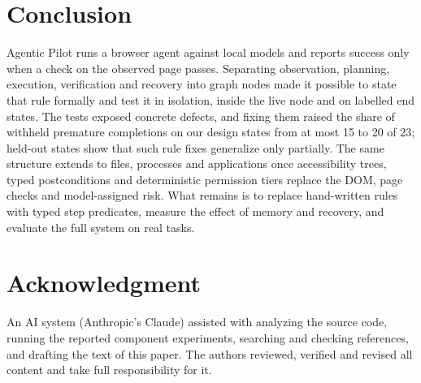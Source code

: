 \section{Conclusion}
\label{sec:conclusion}

Agentic Pilot runs a browser agent against local models and reports success only when a check on the observed page passes. Separating observation, planning, execution, verification and recovery into graph nodes made it possible to state that rule formally and test it in isolation, inside the live node and on labelled end states. The tests exposed concrete defects, and fixing them raised the share of withheld premature completions on our design states from at most 15 to 20 of 23; held-out states show that such rule fixes generalize only partially. The same structure extends to files, processes and applications once accessibility trees, typed postconditions and deterministic permission tiers replace the DOM, page checks and model-assigned risk. What remains is to replace hand-written rules with typed step predicates, measure the effect of memory and recovery, and evaluate the full system on real tasks.

\section*{Acknowledgment}
 An AI system (Anthropic's Claude) assisted with analyzing the source code, running the reported component experiments, searching and checking references, and drafting the text of this paper. The authors reviewed, verified and revised all content and take full responsibility for it.
